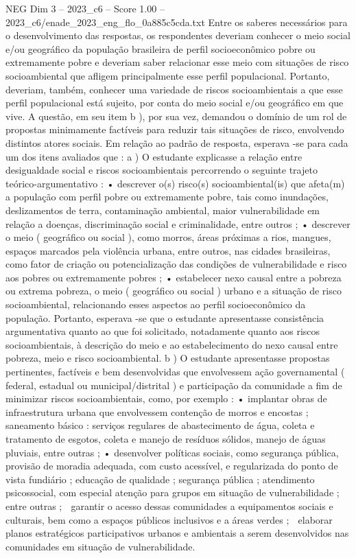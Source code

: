 \begin{textsample}{NEG Dim 3 – 2023\_c6 – Score 1.00 – 2023\_c6/enade\_2023\_eng\_flo\_0a885c5cda.txt}
Entre os saberes necessários para o desenvolvimento das respostas, os respondentes deveriam conhecer o meio social e/ou geográfico da população brasileira de perfil socioeconômico pobre ou extremamente pobre e deveriam saber relacionar esse meio com situações de risco socioambiental que afligem principalmente esse perfil populacional.
Portanto, deveriam, também, conhecer uma variedade de riscos socioambientais a que esse perfil populacional está sujeito, por conta do meio social e/ou geográfico em que vive.
A questão, em seu item b ), por sua vez, demandou o domínio de um rol de propostas minimamente factíveis para reduzir tais situações de risco, envolvendo distintos atores sociais.
Em relação ao padrão de resposta, esperava -se para cada um dos itens avaliados que : a ) O estudante explicasse a relação entre desigualdade social e riscos socioambientais percorrendo o seguinte trajeto teórico-argumentativo : • descrever o(s) risco(s) socioambiental(is) que afeta(m) a população com perfil pobre ou extremamente pobre, tais como inundações, deslizamentos de terra, contaminação ambiental, maior vulnerabilidade em relação a doenças, discriminação social e criminalidade, entre outros ; • descrever o meio ( geográfico ou social ), como morros, áreas próximas a rios, mangues, espaços marcados pela violência urbana, entre outros, nas cidades brasileiras, como fator de criação ou potencialização das condições de vulnerabilidade e risco aos pobres ou extremamente pobres ; • estabelecer nexo causal entre a pobreza ou extrema pobreza, o meio ( geográfico ou social ) urbano e a situação de risco socioambiental, relacionando esses aspectos ao perfil socioeconômico da população.
Portanto, esperava -se que o estudante apresentasse consistência argumentativa quanto ao que foi solicitado, notadamente quanto aos riscos socioambientais, à descrição do meio e ao estabelecimento do nexo causal entre pobreza, meio e risco socioambiental. b ) O estudante apresentasse propostas pertinentes, factíveis e bem desenvolvidas que envolvessem ação governamental ( federal, estadual ou municipal/distrital ) e participação da comunidade a fim de minimizar riscos socioambientais, como, por exemplo : • implantar obras de infraestrutura urbana que envolvessem contenção de morros e encostas ; saneamento básico : serviços regulares de abastecimento de água, coleta e tratamento de esgotos, coleta e manejo de resíduos sólidos, manejo de águas pluviais, entre outras ; • desenvolver políticas sociais, como segurança pública, provisão de moradia adequada, com custo acessível, e regularizada do ponto de vista fundiário ; educação de qualidade ; segurança pública ; atendimento psicossocial, com especial atenção para grupos em situação de vulnerabilidade ; entre outras ;  garantir o acesso dessas comunidades a equipamentos sociais e culturais, bem como a espaços públicos inclusivos e a áreas verdes ;  elaborar planos estratégicos participativos urbanos e ambientais a serem desenvolvidos nas comunidades em situação de vulnerabilidade.

\end{textsample}
